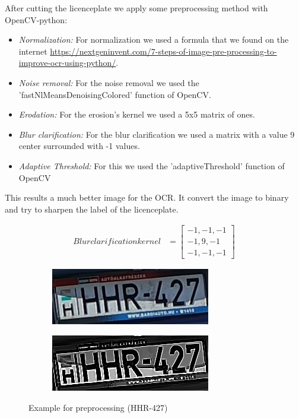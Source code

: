 After cutting the licenceplate we apply some preprocessing method with OpenCV-python:
\begin{itemize}
    \item \emph{Normalization:} For normalization we used a formula that we found on the internet \url{https://nextgeninvent.com/7-steps-of-image-pre-processing-to-improve-ocr-using-python/}.
    \item \emph{Noise removal:} For the noise removal we used the 'fastNlMeansDenoisingColored' function of OpenCV.
    \item \emph{Erodation:} For the erosion's kernel we used a 5x5 matrix of ones.
    \item \emph{Blur clarification:} For the blur clarification we used a matrix with a value 9 center surrounded with -1 values.
    \item \emph{Adaptive Threshold:} For this we used the 'adaptiveThreshold' function of OpenCV
\end{itemize}

This results a much better image for the OCR. It convert the image to binary and try to sharpen the label of the licenceplate. 

\begin{align}
Blur clarification kernel &= \begin{bmatrix}
    -1, -1, -1\\
    -1, 9, -1 \\
    -1, -1, -1
\end{bmatrix}
\end{align}

\begin{figure}
    \begin{subfigure}[b]{.45\textwidth}
        \includegraphics[width=\textwidth]{figures/preprocessbefore.jpg}
    \end{subfigure}
    \hfill
    \begin{subfigure}[b]{.45\textwidth}
        \includegraphics[width=\textwidth]{figures/preprocessafter.jpg}
    \end{subfigure}
    \hfill
    \caption{Example for preprocessing (HHR-427)}
    \label{fig:preprocessing-fig}
\end{figure}